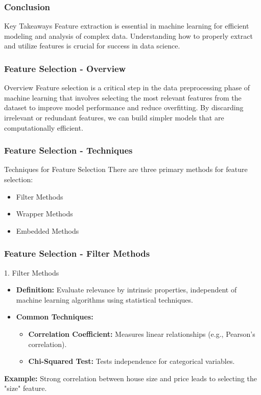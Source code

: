 \documentclass[aspectratio=169]{beamer}
\begin{document}
\begin{frame}
    \frametitle{Conclusion}
    \begin{block}{Key Takeaways}
        Feature extraction is essential in machine learning for efficient modeling and analysis of complex data. Understanding how to properly extract and utilize features is crucial for success in data science.
    \end{block}
\end{frame}

\begin{frame}[fragile]
    \frametitle{Feature Selection - Overview}
    \begin{block}{Overview}
        Feature selection is a critical step in the data preprocessing phase of machine learning that involves selecting the most relevant features from the dataset to improve model performance and reduce overfitting. By discarding irrelevant or redundant features, we can build simpler models that are computationally efficient.
    \end{block}
\end{frame}

\begin{frame}[fragile]
    \frametitle{Feature Selection - Techniques}
    \begin{block}{Techniques for Feature Selection}
        There are three primary methods for feature selection:
        \begin{itemize}
            \item Filter Methods
            \item Wrapper Methods
            \item Embedded Methods
        \end{itemize}
    \end{block}
\end{frame}

\begin{frame}[fragile]
    \frametitle{Feature Selection - Filter Methods}
    \begin{block}{1. Filter Methods}
        \begin{itemize}
            \item \textbf{Definition:} Evaluate relevance by intrinsic properties, independent of machine learning algorithms using statistical techniques.
            \item \textbf{Common Techniques:}
            \begin{itemize}
                \item \textbf{Correlation Coefficient:} Measures linear relationships (e.g., Pearson’s correlation).
                \item \textbf{Chi-Squared Test:} Tests independence for categorical variables.
            \end{itemize}
        \end{itemize}
        \textbf{Example:} Strong correlation between house size and price leads to selecting the "size" feature.
    \end{block}
\end{frame}
\end{document}
